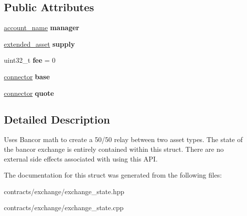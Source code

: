 \subsection*{Public Attributes}
\begin{DoxyCompactItemize}
\item 
\mbox{\label{structaacio_1_1exchange__state_a8832d6597d5c19f5e5af2cb885bdd504}} 
\mbox{\hyperlink{structaacio_1_1chain_1_1name}{account\+\_\+name}} {\bfseries manager}
\item 
\mbox{\label{structaacio_1_1exchange__state_ace09a7ae78d70f90be4c2f1b16c69b66}} 
\mbox{\hyperlink{structaacio_1_1extended__asset}{extended\+\_\+asset}} {\bfseries supply}
\item 
\mbox{\label{structaacio_1_1exchange__state_aab1bd505221ac6a13fb838a58ac92adb}} 
uint32\+\_\+t {\bfseries fee} = 0
\item 
\mbox{\label{structaacio_1_1exchange__state_a30412a29ca5fecc301ccf7a1b7edffe0}} 
\mbox{\hyperlink{structaacio_1_1exchange__state_1_1connector}{connector}} {\bfseries base}
\item 
\mbox{\label{structaacio_1_1exchange__state_af3c5671f82f3873e06ce284c38295008}} 
\mbox{\hyperlink{structaacio_1_1exchange__state_1_1connector}{connector}} {\bfseries quote}
\end{DoxyCompactItemize}


\subsection{Detailed Description}
Uses Bancor math to create a 50/50 relay between two asset types. The state of the bancor exchange is entirely contained within this struct. There are no external side effects associated with using this A\+PI. 

The documentation for this struct was generated from the following files\+:\begin{DoxyCompactItemize}
\item 
contracts/exchange/exchange\+\_\+state.\+hpp\item 
contracts/exchange/exchange\+\_\+state.\+cpp\end{DoxyCompactItemize}
